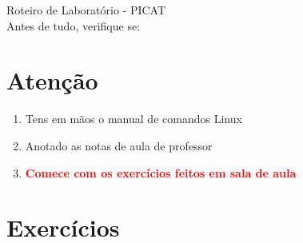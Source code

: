 \documentclass[12pt,a4paper]{article}
\begin{document}
\begin{center}
{\LARGE  Roteiro de Laboratório - PICAT}\\
Antes de tudo, verifique se:

\end{center}



\section{Atenção}
\begin{enumerate}
\item Tens em mãos o manual de comandos Linux
\item Anotado as notas de aula de professor
\item \textbf{\textcolor{red}{Comece com os exercícios feitos em sala de aula}}
\end{enumerate}


\section{Exercícios}
\end{document}
